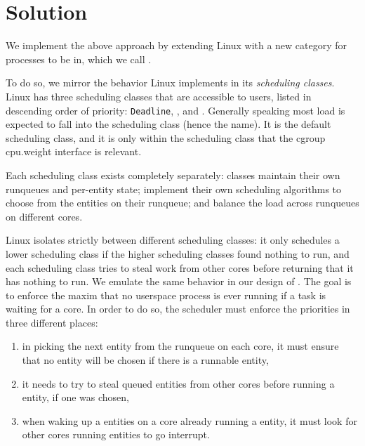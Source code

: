 \section{Solution}\label{s:solution}

We implement the above approach by extending Linux with a new category for
processes to be in, which we call \beclass{}.

To do so, we mirror the behavior Linux implements in its \textit{scheduling
classes}. Linux has three scheduling classes that are accessible to users,
listed in descending order of priority: \texttt{Deadline}, \fifoclass{}, and
\normalclass{}. Generally speaking most load is expected to fall into the
\normalclass{} scheduling class (hence the name). It is the default scheduling
class, and it is only within the \normalclass{} scheduling class that the cgroup
cpu.weight interface is relevant.

Each scheduling class exists completely separately: classes maintain their own
runqueues and per-entity state; implement their own scheduling algorithms to
choose from the entities on their runqueue; and balance the load across
runqueues on different cores.

Linux isolates strictly between different scheduling classes: it only schedules
a lower scheduling class if the higher scheduling classes found nothing to run,
and each scheduling class tries to steal work from other cores before returning
that it has nothing to run. We emulate the same behavior in our design of
\beclass{}. The goal is to enforce the maxim that no \beclass{} userspace process
is ever running if a \normalclass{} task is waiting for a core. In order to do
so, the scheduler must enforce the priorities in three different places:
\begin{enumerate}
    \item in picking the next entity from the runqueue on each core, it must
ensure that no \beclass{} entity will be chosen if there is a runnable
\normalclass{} entity,
    \item it needs to try to steal queued \normalclass{} entities from other cores
before running a \beclass{} entity, if one was chosen,
    \item when waking up a \normalclass{} entities on a core already running a
    \normalclass{} entity, it must look for other cores running \beclass{}
    entities to go interrupt.
\end{enumerate}

